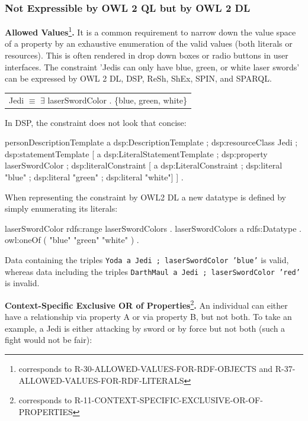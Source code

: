 \documentclass{llncs}
\newcommand{\ms}[1]{\texttt{#1}}
\newenvironment{DL}{
  \scriptsize
  \sffamily
  \vspace{0.3cm}
  \begin{tabular}{l}

}{
  \end{tabular}
  \linebreak
}
\begin{document}
\subsubsection{Not Expressible by OWL 2 QL but by OWL 2 DL}
\label{sec:rdf-validation-requirements-without-reasoning-2}

\textbf{Allowed Values}\footnote{corresponds to R-30-ALLOWED-VALUES-FOR-RDF-OBJECTS and R-37-ALLOWED-VALUES-FOR-RDF-LITERALS}\textbf{.}
It is a common requirement to narrow down the value space of a property by an exhaustive enumeration of the valid values (both literals or resources). This is often rendered in drop down boxes or radio buttons in user interfaces. 
The constraint 'Jedis can only have blue, green, or white laser swords' can be expressed by OWL 2 DL, DSP, ReSh, ShEx, SPIN, and SPARQL.

\begin{DL}
Jedi $\equiv$ $\exists$ laserSwordColor . \{blue, green, white\} \\
\end{DL}

In DSP, the constraint does not look that concise:

\begin{ex}
personDescriptionTemplate
    a dsp:DescriptionTemplate ;
    dsp:resourceClass Jedi ;
    dsp:statementTemplate [
        a dsp:LiteralStatementTemplate ;
        dsp:property laserSwordColor ;
        dsp:literalConstraint [
            a dsp:LiteralConstraint ;
            dsp:literal "blue" ;
            dsp:literal "green" ;
            dsp:literal "white"] ] .
\end{ex}

When representing the constraint by OWL2 DL a new datatype is defined by simply enumerating its literals:

\begin{ex}
laserSwordColor rdfs:range laserSwordColors . 
laserSwordColors
    a rdfs:Datatype .
    owl:oneOf ( "blue" "green" "white" ) .
\end{ex}

Data containing the triples \ms{Yoda a Jedi ; laserSwordColor 'blue'} is valid, 
whereas data including the triples \ms{DarthMaul a Jedi ; laserSwordColor 'red'} is invalid.

\textbf{Context-Specific Exclusive OR of Properties}\footnote{corresponds to  R-11-CONTEXT-SPECIFIC-EXCLUSIVE-OR-OF-PROPERTIES}\textbf{.}
An individual can either have a relationship via property A or via property B, but not both.
To take an example, a Jedi is either attacking by sword or by force but not both (such a fight would not be fair):
\end{document}
